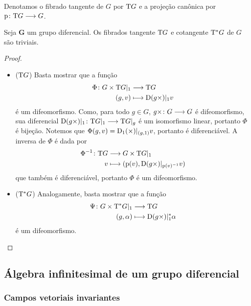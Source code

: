 Denotamos o fibrado tangente de $G$ por $\mathrm{T} G$ e a projeção canônica por ${\mathrm{p}}\colon {\mathrm{T}G} \longrightarrow {G}$.

\begin{proposition}
Seja $\bm G$ um grupo diferencial. Os fibrados tangente $\mathrm{T} G$ e cotangente $\mathrm{T}^* G$ de $G$ são triviais.
\end{proposition}
\begin{proof}
\begin{itemize}
\item ($\mathrm{T} G$) Basta mostrar que a função
	\begin{align*}
	{\Phi}\colon {G \times \mathrm{T}G|_1} &\longrightarrow {\mathrm{T}G} \\{(g,v)} &\longmapsto \mathrm{D}(g \times)|_1 v
	\end{align*}
é um difeomorfismo. Como, para todo $g \in G$, ${g\times}\colon {G} \longrightarrow {G}$ é difeomorfismo, sua diferencial ${\mathrm{D}(g\times)|_1}\colon {\mathrm{T}G|_1} \longrightarrow {\mathrm{T}G|_g}$ é um isomorfismo linear, portanto $\Phi$ é bijeção. Notemos que $\Phi(g,v) = \mathrm{D}_1(\times)|_{(g,1)}v$, portanto é diferenciável. A inversa de $\Phi$ é dada por
	\begin{align*}
		{\Phi^{-1}}\colon {\mathrm{T}G} &\longrightarrow {G \times \mathrm{T}G|_1} \\{v} &\longmapsto (\mathrm{p}(v),\mathrm{D}(g \times)|_{\mathrm{p}(v)^{-1}}v)
	\end{align*}
que também é diferenciável, portanto $\Phi$ é um difeomorfismo.

\item ($\mathrm{T}^* G$) Analogamente, basta mostrar que a função
	\begin{align*}
	{\Psi}\colon {G \times \mathrm{T}^* G|_1} &\longrightarrow {\mathrm{T}G} \\{(g,\alpha)} &\longmapsto \mathrm{D}(g \times)|_1^* \alpha
	\end{align*}
é um difeomorfismo.
\end{itemize}
\end{proof}

\subsection{Álgebra infinitesimal de um grupo diferencial}

\subsubsection{Campos vetoriais invariantes}

